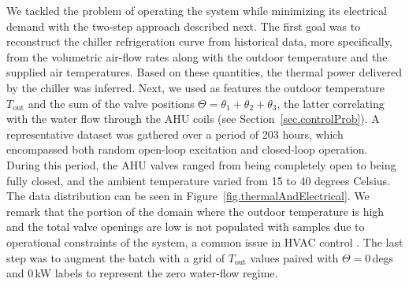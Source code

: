 We tackled the problem of operating the system while minimizing its electrical demand with the two-step approach described next. The first goal was to reconstruct the chiller refrigeration curve from historical data, more specifically, from the volumetric air-flow rates along with the outdoor temperature and the supplied air temperatures. Based on these quantities, the thermal power delivered by the chiller was inferred. Next, we used as features the outdoor temperature $T_\text{out}$ and the sum of the valve positions $\Theta = \theta_1 + \theta_2 + \theta_3$, the latter correlating with the water flow through the AHU coils (see Section~\ref{sec.controlProb}). A representative dataset was gathered over a period of 203 hours, which encompassed both random open-loop excitation and closed-loop operation. During this period, the AHU valves ranged from being completely open to being fully closed, and the ambient temperature varied from 15 to 40 degrees Celsius. The data distribution can be seen in Figure~\ref{fig.thermalAndElectrical}. We remark that the portion of the domain where the outdoor temperature is high and the total valve openings are low is not populated with samples due to operational constraints of the system, a common issue in HVAC control \cite{maddalena2020data}. The last step was to augment the batch with a grid of $T_\text{out}$ values paired with $\Theta=0\,$degs and $0\,$kW labels to represent the zero water-flow regime.

